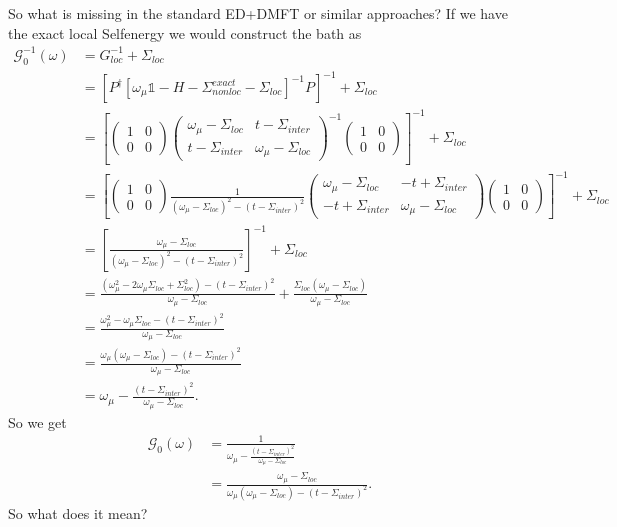 \documentclass[12pt,a4paper]{scrartcl}
\numberwithin{equation}{section}
\newcommand{\unity}{\mathds{1}}
\begin{document}
So what is missing in the standard ED+DMFT or similar approaches?
If we have the exact local Selfenergy we would construct the bath as
\begin{align}
 \mathcal{G}_0^{-1}(\omega) 
 &= G_{loc}^{-1} + \Sigma_{loc} \\
 &= \left[ P^{\dagger} \left[  \omega_{\mu}\unity - H - \Sigma^{exact}_{nonloc} - \Sigma_{loc} \right]^{-1} P\right]^{-1} +  \Sigma_{loc} \nonumber \\
 &= \left[
 \begin{pmatrix}
     1 & 0 \\ 0 & 0
    \end{pmatrix}
   \begin{pmatrix}
     \omega_{\mu}-\Sigma_{loc} & t-\Sigma_{inter} \\ t-\Sigma_{inter}  & \omega_{\mu}-\Sigma_{loc}
    \end{pmatrix}^{-1}
    \begin{pmatrix}
     1 & 0 \\ 0 & 0
    \end{pmatrix} 
\right]^{-1} +  \Sigma_{loc}  \nonumber\\
%
&= \left[
 \begin{pmatrix}
     1 & 0 \\ 0 & 0
    \end{pmatrix}
    \frac{1}{(\omega_{\mu}-\Sigma_{loc})^{2} -(t-\Sigma_{inter})^2 }
   \begin{pmatrix}
     \omega_{\mu}-\Sigma_{loc} & -t+\Sigma_{inter} \\ -t+\Sigma_{inter}  & \omega_{\mu}-\Sigma_{loc}
    \end{pmatrix} 
    \begin{pmatrix}
     1 & 0 \\ 0 & 0
    \end{pmatrix} 
\right]^{-1} +  \Sigma_{loc}  \nonumber\\
%
&= \left[
    \frac{\omega_{\mu}-\Sigma_{loc}}{(\omega_{\mu}-\Sigma_{loc})^{2} -(t-\Sigma_{inter})^2 }
\right]^{-1} +  \Sigma_{loc}  \nonumber\\
%
&= \frac{(\omega_{\mu}^2 -2\omega_{\mu}\Sigma_{loc}+\Sigma_{loc}^2 ) -(t-\Sigma_{inter})^2 }{\omega_{\mu}-\Sigma_{loc}}
 +  \frac{\Sigma_{loc}(\omega_{\mu}-\Sigma_{loc})}{\omega_{\mu}-\Sigma_{loc}}  \nonumber\\
 &= \frac{\omega_{\mu}^2 -\omega_{\mu}\Sigma_{loc}  -(t-\Sigma_{inter})^2 }{\omega_{\mu}-\Sigma_{loc}} \nonumber\\
 &= \frac{\omega_{\mu} ( \omega_{\mu}- \Sigma_{loc})  -(t-\Sigma_{inter})^2 }{\omega_{\mu}-\Sigma_{loc}} \nonumber\\
 &= \omega_{\mu} - \frac{ (t-\Sigma_{inter})^2 }{\omega_{\mu}-\Sigma_{loc}} .
\end{align}
So we get
\begin{align}
 \mathcal{G}_0(\omega) 
 &= \frac{1}{\omega_{\mu} - \frac{ (t-\Sigma_{inter})^2 }{\omega_{\mu}-\Sigma_{loc}} } \nonumber \\
 &= \frac{\omega_{\mu}-\Sigma_{loc} }{\omega_{\mu}(\omega_{\mu}-\Sigma_{loc}) -  (t-\Sigma_{inter})^2  } .
\end{align}
So what does it mean?
\end{document}
